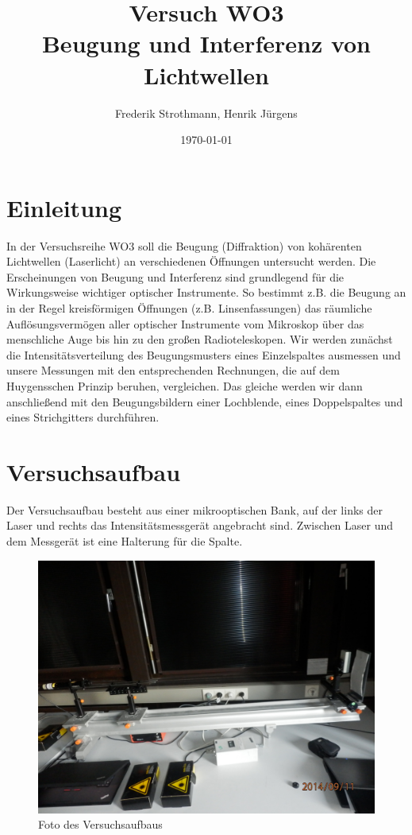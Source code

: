 \documentclass[12pt]{scrartcl}
\title{Versuch WO3\\ Beugung und Interferenz von Lichtwellen}
\author{Frederik Strothmann, Henrik Jürgens}
\date{\today}
\begin{document}

\maketitle
\newpage
\tableofcontents
\newpage


\section{Einleitung}

In der Versuchsreihe WO3 soll die Beugung (Diffraktion) von kohärenten Lichtwellen (Laserlicht) an verschiedenen Öffnungen untersucht werden.
Die Erscheinungen von Beugung und Interferenz sind grundlegend für die Wirkungsweise wichtiger optischer Instrumente. So bestimmt z.B. die Beugung an in der Regel kreisförmigen Öffnungen (z.B. Linsenfassungen) das räumliche Auflösungsvermögen aller optischer Instrumente vom Mikroskop über das menschliche Auge bis hin zu den großen Radioteleskopen. Wir werden zunächst die Intensitätsverteilung des Beugungsmusters eines Einzelspaltes ausmessen und unsere Messungen mit den entsprechenden Rechnungen, die auf dem Huygensschen Prinzip beruhen, vergleichen. Das gleiche werden wir dann anschließend mit den Beugungsbildern einer Lochblende, eines Doppelspaltes und eines Strichgitters durchführen.

\section{Versuchsaufbau}
Der Versuchsaufbau besteht aus einer mikrooptischen Bank, auf der links der Laser und rechts das Intensitätsmessgerät angebracht sind. Zwischen Laser und dem Messgerät ist eine Halterung für die Spalte.

\begin{figure}[H]
\centering
    \includegraphics[scale = 0.1]{versuchsaufbau.JPG}
  	\caption[Foto des Versuchsaufbaus]{Foto des Versuchsaufbaus}
  \label{fig:versuchsaufbau}
\end{figure}
\end{document}
